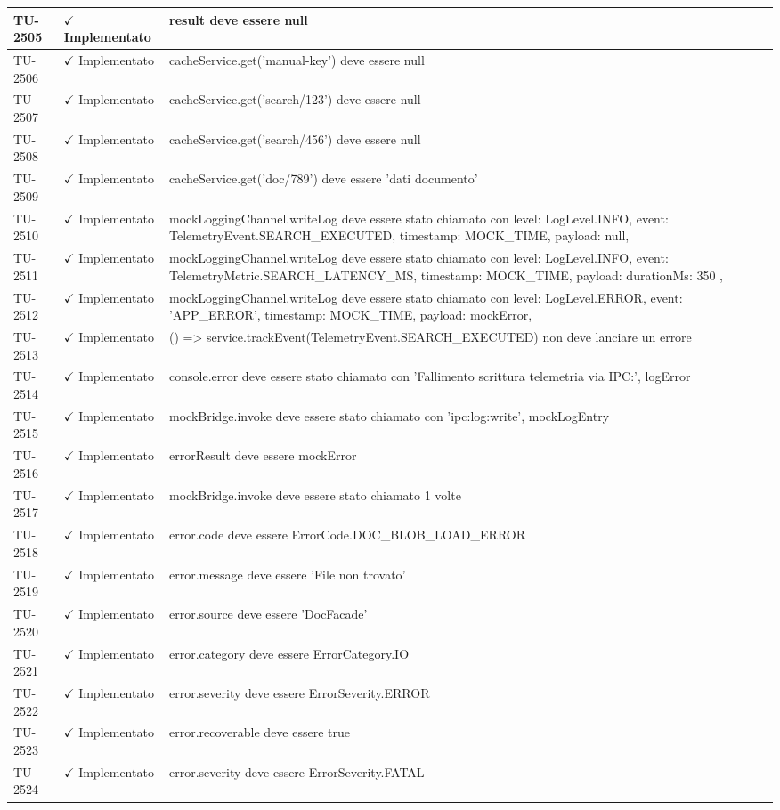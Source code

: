 ﻿\documentclass[a4paper,12pt]{article}
\newcommand{\ok}{\textcolor{green!60!black}{$\checkmark$ Implementato}}
\begin{document}
\begin{longtable}{|p{2cm}|p{3.5cm}|p{9.5cm}|}
\hline
TU-2505 & \ok & result deve essere null \\
\hline
TU-2506 & \ok & cacheService.get('manual-key') deve essere null \\
\hline
TU-2507 & \ok & cacheService.get('search/123') deve essere null \\
\hline
TU-2508 & \ok & cacheService.get('search/456') deve essere null \\
\hline
TU-2509 & \ok & cacheService.get('doc/789') deve essere 'dati documento' \\
\hline
TU-2510 & \ok & mockLoggingChannel.writeLog deve essere stato chiamato con { level: LogLevel.INFO, event: TelemetryEvent.SEARCH\_EXECUTED, timestamp: MOCK\_TIME, payload: null, } \\
\hline
TU-2511 & \ok & mockLoggingChannel.writeLog deve essere stato chiamato con { level: LogLevel.INFO, event: TelemetryMetric.SEARCH\_LATENCY\_MS, timestamp: MOCK\_TIME, payload: { durationMs: 350 }, } \\
\hline
TU-2512 & \ok & mockLoggingChannel.writeLog deve essere stato chiamato con { level: LogLevel.ERROR, event: 'APP\_ERROR', timestamp: MOCK\_TIME, payload: mockError, } \\
\hline
TU-2513 & \ok & () => service.trackEvent(TelemetryEvent.SEARCH\_EXECUTED) non deve lanciare un errore \\
\hline
TU-2514 & \ok & console.error deve essere stato chiamato con 'Fallimento scrittura telemetria via IPC:', logError \\
\hline
TU-2515 & \ok & mockBridge.invoke deve essere stato chiamato con 'ipc:log:write', mockLogEntry \\
\hline
TU-2516 & \ok & errorResult deve essere mockError \\
\hline
TU-2517 & \ok & mockBridge.invoke deve essere stato chiamato 1 volte \\
\hline
TU-2518 & \ok & error.code deve essere ErrorCode.DOC\_BLOB\_LOAD\_ERROR \\
\hline
TU-2519 & \ok & error.message deve essere 'File non trovato' \\
\hline
TU-2520 & \ok & error.source deve essere 'DocFacade' \\
\hline
TU-2521 & \ok & error.category deve essere ErrorCategory.IO \\
\hline
TU-2522 & \ok & error.severity deve essere ErrorSeverity.ERROR \\
\hline
TU-2523 & \ok & error.recoverable deve essere true \\
\hline
TU-2524 & \ok & error.severity deve essere ErrorSeverity.FATAL \\

\end{longtable}
\end{document}
